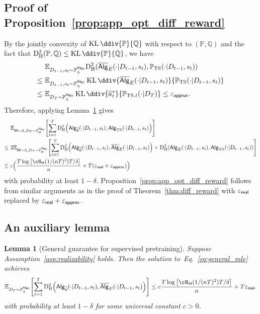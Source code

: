 \documentclass[10pt]{article}
\newtheorem{lemma}[theorem]{Lemma}
\renewcommand{\epsilon}{\varepsilon}
\newcommand{\eps}{\varepsilon}
\newcommand{\KL}{\operatorname{KL}\ddiv}
\newcommand{\<}{\left\langle}
\renewcommand{\>}{\right\rangle}
\newcommand{\paren}[1]{{\left( #1 \right)}}
\newcommand{\brac}[1]{{\left[ #1 \right]}}
\newcommand{\E}{\mathbb{E}}
\renewcommand{\P}{\mathbb{P}}
\newcommand{\Q}{\mathbb{Q}}
\newcommand{\inst}{{\mathsf{M}}}
\newcommand{\HelDs}{{\mathrm{D}^2_{\mathrm{H}}}}
\newcommand{\TS}{{\mathrm{TS}}}
\newcommand{\state}{{s}}
\newcommand{\action}{{a}}
\newcommand{\totlen}{{T}} %
\newcommand{\sAlg}{{\mathsf{Alg}}}
\newcommand{\osAlg}{\overline{\mathsf{Alg}}}
\newcommand{\dset}{{D}}
\newcommand{\Numobs}{{n}}   %
\newcommand{\Parspace}{{\Theta}}
\newcommand{\appeps}{\eps_{{\mathsf{approx}}}}
\newcommand{\EstPar}{{\widehat{\theta}}}
\newcommand{\prior}{{\Lambda}}
\newcommand{\shortexp}{{E}}
\newcommand{\geneps}{{\epsilon}_{\sf real}}
\begin{document}
\subsection{Proof of Proposition~\ref{prop:app_opt_diff_reward}}\label{app:proof-prop-diff-reward-app-opt}

By the jointly convexity of $\KL{\P}{\Q}$ with respect to $(\P,\Q)$ and the fact that $\HelDs(\P,\Q)\leq\KL{\P}{\Q}$, we have 
\begin{align*}
  &~\E_{\dset_{t-1},\state_t\sim\P_\prior^{\sAlg_0}}\HelDs(\osAlg_{\shortexp}(\cdot|\dset_{t-1},\state_t),\P_{\TS}(\cdot|\dset_{t-1},\state_t))\\
  \leq &~
  \E_{\dset_{t-1},\state_t\sim\P_\prior^{\sAlg_0}}\KL{\osAlg_{\shortexp}(\cdot|\dset_{t-1},\state_t)}{\P_{\TS}(\cdot|\dset_{t-1},\state_t)}\\
   \leq &~
 \E_{\dset_\totlen\sim\P_{\prior}^{\sAlg_0}}\KL{\widehat\action^*_t}{\P_{\TS,t}(\cdot|\dset_\totlen)}\leq\appeps.
\end{align*} Therefore, applying Lemma~\ref{lm:general_imit} gives
 \begin{align*}
        &~\E_{\inst\sim \prior, \dset_\totlen\sim \P^{\sAlg_0}_\inst}\brac{ \sum_{t=1}^\totlen \HelDs\paren{ \sAlg_{{\EstPar}}(\cdot|\dset_{t-1},\state_t ), \sAlg_{\TS}(\cdot|\dset_{t-1},\state_t )} }\\
        \le&~
        2\E_{\inst\sim \prior, \dset_\totlen\sim \P^{\sAlg_0}_\inst}\brac{ \sum_{t=1}^\totlen \HelDs\paren{ \sAlg_{{\EstPar}}(\cdot|\dset_{t-1},\state_t ), \osAlg_{\shortexp}(\cdot|\dset_{t-1},\state_t )}+\HelDs\paren{ \sAlg_{{\shortexp}}(\cdot|\dset_{t-1},\state_t ), \sAlg_{\TS}(\cdot|\dset_{t-1},\state_t )} }\\
       \le&~
       c\Big(\frac{\totlen \log \brac{ \cN_{\Parspace}(1/(\Numobs\totlen)^2) \totlen/\delta } }{n} + \totlen(\geneps+\appeps)\Big)
    \end{align*} 
    with probability at least $1-\delta$. Proposition~\ref{prop:app_opt_diff_reward} follows from similar arguments as in the proof of Theorem~\ref{thm:diff_reward} with $\geneps$ replaced by $\geneps+\appeps$. 

\subsection{An auxiliary lemma}

\begin{lemma}[General guarantee for supervised pretraining]\label{lm:general_imit}
Suppose Assumption~\ref{asp:realizability} holds. Then  the solution to~Eq.~\eqref{eq:general_mle} achieves
\begin{align*}
\E_{\dset_\totlen\sim \P^{\sAlg_0}_\prior}\brac{ \sum_{t=1}^\totlen \HelDs\paren{ \sAlg_{{\EstPar}}(\cdot|\dset_{t-1},\state_t ), \osAlg_{\shortexp}(\cdot|\dset_{t-1},\state_t )} } \le c\frac{\totlen \log \brac{ \cN_{\Parspace}(1/(\Numobs\totlen)^2) \totlen/\delta } }{n} + \totlen\geneps.
\end{align*}
with probability at least $1-\delta$ for some universal constant $c>0$.
\end{lemma}
\end{document}
